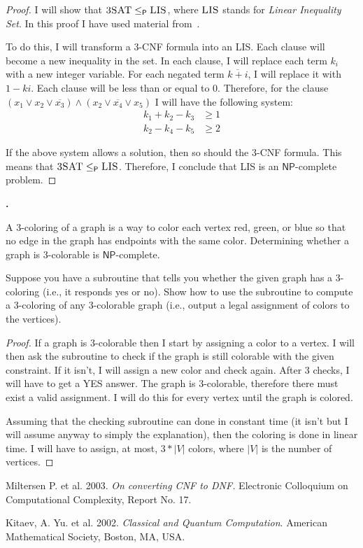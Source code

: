 \documentclass[letterpaper,11pt]{article}
\newcommand{\cc}[1]{\ensuremath{\textsf{#1}}\xspace}
\newcommand{\NP}{\cc{NP}}
\newcommand{\karp}{\le_{\textsf{P}}}
\newcounter{problem}
\newenvironment{problem}%
{%
	\stepcounter{problem}%
	\textbf{\theproblem.}
	\large
}{\\}%
\begin{document}
\begin{proof}
I will show that $\textsc{3SAT} \karp \textsc{LIS}$, where $\textsc{LIS}$ stands for {\it Linear Inequality Set}.
In this proof I have used material from~\cite{clasical}.

To do this, I will transform a 3-{\sc CNF} formula into an {\sc LIS}.
Each clause will become a new inequality in the set.
In each clause, I will replace each term $k_{i}$ with a new integer variable.
For each negated term $\overline{k+{i}}$, I will replace it with $1-k{i}$.
Each clause will be less than or equal to 0.
Therefore, for the clause $(x_{1} \vee x_{2} \vee \overline{x_{3}}) \wedge (x_{2} \vee \overline{x_{4}} \vee x_{5})$ I will have the following system:
%
\begin{align*}
	k_{1} + k_{2} - k_{3} &\ge 1 \\
	k_{2} - k_{4} - k_{5} &\ge 2 
\end{align*}

If the above system allows a solution, then so should the 3-{\sc CNF} formula.
This means that $\textsc{3SAT} \karp \textsc{LIS}$.
Therefore, I conclude that {\sc LIS} is an $\NP$-complete problem.

\end{proof}

\begin{problem}
A 3-coloring of a graph is a way to color each vertex red, green, or blue so that no edge in the graph has endpoints with the same color. Determining whether a graph is 3-colorable is \NP-complete.

Suppose you have a subroutine that tells you whether the given graph has a 3-coloring (i.e., it responds {\sc yes} or {\sc no}). Show how to use the subroutine to compute a 3-coloring of any 3-colorable graph (i.e., output a legal assignment of colors to the vertices).
\end{problem}

\begin{proof}
If a graph is 3-colorable then I start by assigning a color to a vertex.
I will then ask the subroutine to check if the graph is still colorable with the given constraint.
If it isn't, I will assign a new color and check again.
After 3 checks, I will have to get a {\sc YES} answer.
The graph is 3-colorable, therefore there must exist a valid assignment.
I will do this for every vertex until the graph is colored.

Assuming that the checking subroutine can done in constant time (it isn't but I will assume anyway to simply the explanation), then the coloring is done in linear time.
I will have to assign, at most, $3*|V|$ colors, where $|V|$ is the number of vertices.
\end{proof}

\begin{thebibliography}{1}

 Miltersen P. et al. 2003. {\em On converting CNF to DNF.} Electronic Colloquium on Computational Complexity, Report No. 17.

 Kitaev, A. Yu. et al. 2002. {\em Classical and Quantum Computation}. American Mathematical Society, Boston, MA, USA.


\end{thebibliography}
\end{document}
